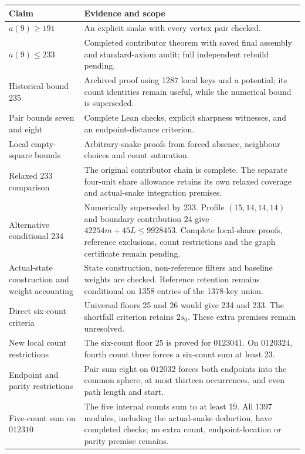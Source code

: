 \documentclass[11pt,a4paper]{article}
\theoremstyle{definition}
\theoremstyle{remark}
\begin{document}
\begin{center}
\begin{tabular}{p{}p{}}
\toprule
Claim & Evidence and scope\\\midrule
$a(9)\ge191$ & An explicit snake with every vertex pair checked.\\
$a(9)\le233$ & Completed contributor theorem with saved final assembly and standard-axiom audit; full independent rebuild pending.\\
Historical bound 235 & Archived proof using 1287 local keys and a potential; its count identities remain useful, while the numerical bound is superseded.\\
Pair bounds seven and eight & Complete Lean checks, explicit sharpness witnesses, and an endpoint-distance criterion.\\
Local empty-square bounds & Arbitrary-snake proofs from forced absence, neighbour choices and count saturation.\\
Relaxed 233 comparison & The original contributor chain is complete. The separate four-unit share allowance retains its own relaxed coverage and actual-snake integration premises.\\
Alternative conditional 234 & Numerically superseded by 233. Profile $(15,14,14,14)$ and boundary contribution 24 give $42254m+45L\le9928453$. Complete local-share proofs, reference exclusions, count restrictions and the graph certificate remain pending.\\
Actual-state construction and weight accounting & State construction, non-reference filters and baseline weights are checked. Reference retention remains conditional on 1358 entries of the 1378-key union.\\
Direct six-count criteria & Universal floors 25 and 26 would give 234 and 233. The shortfall criterion retains $2s_0$. These extra premises remain unresolved.\\
New local count restrictions & The six-count floor 25 is proved for $0123041$. On $0120324$, fourth count three forces a six-count sum at least 23.\\
Endpoint and parity restrictions & Pair sum eight on $012032$ forces both endpoints into the common sphere, at most thirteen occurrences, and even path length and start.\\
Five-count sum on $012310$ & The five internal counts sum to at least 19. All 1397 modules, including the actual-snake deduction, have completed checks; no extra count, endpoint-location or parity premise remains.\\

\end{tabular}
\end{center}
\end{document}
